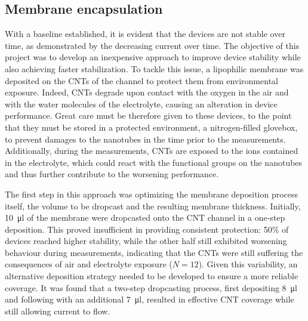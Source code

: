 \subsection{Membrane encapsulation}
\label{sec:membrane_encapsulation}

With a baseline established, it is evident that the devices are not stable over time, as demonstrated by the decreasing current over time. The objective of this project was to develop an inexpensive approach to improve device stability while also achieving faster stabilization. To tackle this issue, a lipophilic membrane was deposited on the CNTs of the channel to protect them from environmental exposure. Indeed, CNTs degrade upon contact with the oxygen in the air and with the water molecules of the electrolyte, causing an alteration in device performance. Great care must be therefore given to these devices, to the point that they must be stored in a protected environment, \ie{} a nitrogen-filled glovebox, to prevent damages to the nanotubes in the time prior to the measurements. Additionally, during the measurements, CNTs are exposed to the ions contained in the electrolyte, which could react with the functional groups on the nanotubes and thus further contribute to the worsening performance.

The first step in this approach was optimizing the membrane deposition process itself, \ie{} the volume to be dropcast and the resulting membrane thickness. Initially, \SI{10}{\ul} of the membrane were dropcasted onto the CNT channel in a one-step deposition. This proved insufficient in providing consistent protection: 50\% of devices reached higher stability, while the other half still exhibited worsening behaviour during measurements, indicating that the CNTs were still suffering the consequences of air and electrolyte exposure ($N = 12$). Given this variability, an alternative deposition strategy needed to be developed to ensure a more reliable coverage.
It was found that a two-step dropcasting process, \ie{} first depositing \SI{8}{\ul} and following with an additional \SI{7}{\ul}, resulted in effective CNT coverage while still allowing current to flow.

